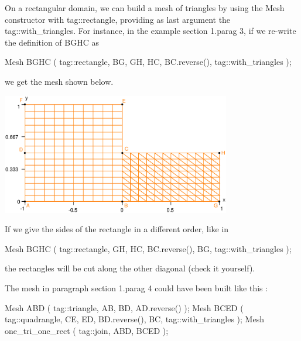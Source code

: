 On a rectangular domain, we can build a mesh of triangles by using the {\codett Mesh} constructor
with {\codett tag::rectangle}, providing as last argument the {\codett tag::with\_triangles}.
For instance, in the example \numb section 1.\numb parag 3, if we re-write the definition of
{\codett BGHC} as

\verbatim
   Mesh BGHC ( tag::rectangle, BG, GH, HC, BC.reverse(), tag::with_triangles );
\endverbatim

\noindent we get the mesh shown below.

{ 
\centerline{\includegraphics[width=10cm]{L-shaped-tri.eps}} }

If we give the sides of the rectangle in a different order, like in

\verbatim
   Mesh BGHC ( tag::rectangle, GH, HC, BC.reverse(), BG, tag::with_triangles );
\endverbatim

\noindent the rectangles will be cut along the other diagonal (check it yourself).

The mesh in paragraph \numb section 1.\numb parag 4 could have been built like this :

\verbatim
   Mesh ABD ( tag::triangle, AB, BD, AD.reverse() );
   Mesh BCED ( tag::quadrangle, CE, ED, BD.reverse(), BC, tag::with_triangles );
   Mesh one_tri_one_rect ( tag::join, ABD, BCED );
\endverbatim


